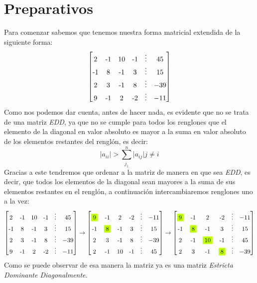 \documentclass{article}
\providecommand{\abs}[1]{\lvert#1\rvert}
\begin{document}
\section{Preparativos}
Para comenzar sabemos que tenemos nuestra forma matricial extendida de la siguiente forma:
\begin{equation*}
   \begin{bmatrix}
       2 & $-1$ & 10 & $-1$ & \vdots & 45\\
       $-1$ & 8 & $-1$ & 3 & \vdots & 15 \\
       2 & 3 & $-1$ & 8 & \vdots & -39 \\
       9 & $-1$ & 2 & $-2$ & \vdots & -11
   \end{bmatrix}
\end{equation*}
Como nos podemos dar cuenta, antes de hacer nada, es evidente que no se trata de una matriz \emph{EDD},
ya que no se cumple para todos los renglones que el elemento de la diagonal en valor absoluto es mayor
a la suma en valor absoluto de los elementos restantes del renglón, es decir:
\begin{equation*}
   \abs{a_{ii}} > \sum_{j_1}^{n} \abs{a_{ij}} j \neq i
\end{equation*}
Gracias a este tendremos que ordenar a la matriz de manera en que sea \emph{EDD}, es decir, que todos
los elementos de la diagonal sean mayores a la suma de sus elementos restantes en el renglón, a continuación
intercambiaremos renglones uno a la vez:
\begin{equation*}
   \begin{bmatrix}
       2 & $-1$ & 10 & $-1$ & \vdots & 45\\
       $-1$ & 8 & $-1$ & 3 & \vdots & 15 \\
       2 & 3 & $-1$ & 8 & \vdots & -39 \\
       9 & $-1$ & 2 & $-2$ & \vdots & -11
   \end{bmatrix}
   \rightarrow
   \begin{bmatrix}
       \colorbox{lime} 9 & $-1$ & 2 & $-2$ & \vdots & -11\\
       $-1$ & \colorbox{lime} 8 & $-1$ & 3 & \vdots & 15 \\
       2 & 3 & $-1$ & 8 & \vdots & -39 \\
       2 & $-1$ & 10 & $-1$ & \vdots & 45
   \end{bmatrix}
   \rightarrow
   \begin{bmatrix}
       \colorbox{lime} 9 & $-1$ & 2 & $-2$ & \vdots & -11\\
       $-1$ & \colorbox{lime} 8 & $-1$ & 3 & \vdots & 15 \\
       2 & $-1$ & \colorbox{lime}{10} & $-1$ & \vdots & 45\\
       2 & 3 & $-1$ & \colorbox{lime}8 & \vdots & -39
   \end{bmatrix}
\end{equation*}
Como se puede observar de esa manera la matriz ya es una matriz \emph{Estricta
Dominante Diagonalmente}.
\end{document}
